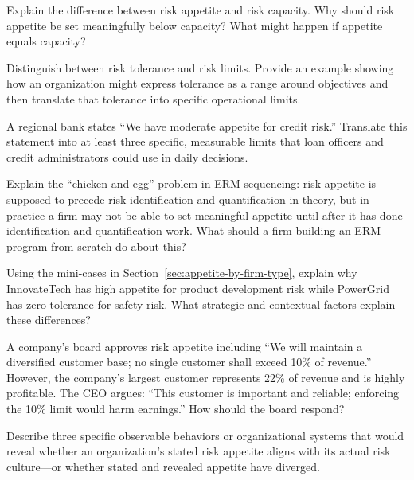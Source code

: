 \documentclass[11pt,openany]{book}
\begin{document}
\begin{discussionquestions}
\item Explain the difference between risk appetite and risk capacity. Why should
  risk appetite be set meaningfully below capacity? What might happen if
  appetite equals capacity?

\item Distinguish between risk tolerance and risk limits. Provide an example
  showing how an organization might express tolerance as a range around
  objectives and then translate that tolerance into specific operational limits.

\item A regional bank states ``We have moderate appetite for credit risk.''
  Translate this statement into at least three specific, measurable limits that
  loan officers and credit administrators could use in daily decisions.

\item Explain the ``chicken-and-egg'' problem in ERM sequencing: risk appetite
  is supposed to precede risk identification and quantification in theory, but
  in practice a firm may not be able to set meaningful appetite until after it
  has done identification and quantification work. What should a firm building
  an ERM program from scratch do about this?

\item Using the mini-cases in Section~\ref{sec:appetite-by-firm-type}, explain
  why InnovateTech has high appetite for product development risk while
  PowerGrid has zero tolerance for safety risk. What strategic and contextual
  factors explain these differences?

\item A company's board approves risk appetite including ``We will maintain a
  diversified customer base; no single customer shall exceed 10\% of revenue.''
  However, the company's largest customer represents 22\% of revenue and is
  highly profitable. The CEO argues: ``This customer is important and reliable;
  enforcing the 10\% limit would harm earnings.'' How should the board respond?

\item Describe three specific observable behaviors or organizational systems
  that would reveal whether an organization's stated risk appetite aligns with
  its actual risk culture---or whether stated and revealed appetite have
  diverged.


\end{discussionquestions}
\end{document}
